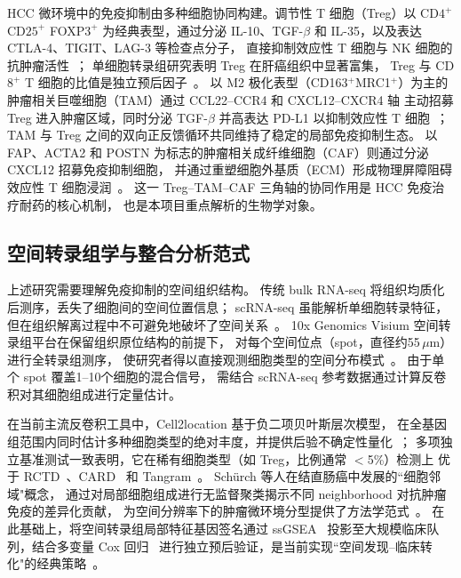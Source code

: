 \documentclass[12pt, a4paper]{ctexart}
\begin{document}
HCC 微环境中的免疫抑制由多种细胞协同构建。调节性 T 细胞（Treg）以 CD$4^+$CD$25^+$ FOXP$3^+$ 为经典表型，通过分泌 IL-10、TGF-$\beta$ 和 IL-35，以及表达 CTLA-4、TIGIT、LAG-3 等检查点分子，
直接抑制效应性 T 细胞与 NK 细胞的抗肿瘤活性~\citep{sakaguchi2020regulatory}；
单细胞转录组研究表明 Treg 在肝癌组织中显著富集，
Treg 与 CD$8^+$ T 细胞的比值是独立预后因子~\citep{zheng2017landscape}。
以 M2 极化表型（CD163$^+$MRC1$^+$）为主的肿瘤相关巨噬细胞（TAM）通过 CCL22--CCR4 和 CXCL12--CXCR4 轴
主动招募 Treg 进入肿瘤区域，同时分泌 TGF-$\beta$ 并高表达 PD-L1 以抑制效应性 T 细胞~\citep{noy2014tumor}；
TAM 与 Treg 之间的双向正反馈循环共同维持了稳定的局部免疫抑制生态。
以 FAP、ACTA2 和 POSTN 为标志的肿瘤相关成纤维细胞（CAF）则通过分泌 CXCL12 招募免疫抑制细胞，
并通过重塑细胞外基质（ECM）形成物理屏障阻碍效应性 T 细胞浸润~\citep{kalluri2016biology,mariathasan2018tgfb}。
这一 Treg--TAM--CAF 三角轴的协同作用是 HCC 免疫治疗耐药的核心机制，
也是本项目重点解析的生物学对象。

\subsection{空间转录组学与整合分析范式}

上述研究需要理解免疫抑制的空间组织结构。
传统 bulk RNA-seq 将组织均质化后测序，丢失了细胞间的空间位置信息；
scRNA-seq 虽能解析单细胞转录特征，但在组织解离过程中不可避免地破坏了空间关系~\citep{luecken2019current}。
10x Genomics Visium 空间转录组平台在保留组织原位结构的前提下，
对每个空间位点（spot，直径约55\,$\mu$m）进行全转录组测序，
使研究者得以直接观测细胞类型的空间分布模式~\citep{williams2022introduction}。
由于单个 spot 覆盖1--10个细胞的混合信号，
需结合 scRNA-seq 参考数据通过计算反卷积对其细胞组成进行定量估计。

在当前主流反卷积工具中，Cell2location 基于负二项贝叶斯层次模型，
在全基因组范围内同时估计多种细胞类型的绝对丰度，并提供后验不确定性量化~\citep{kleshchevnikov2022cell2location}；
多项独立基准测试一致表明，它在稀有细胞类型（如 Treg，比例通常 $<$5\%）检测上
优于 RCTD~\citep{cable2021robust}、CARD~\citep{ma2022integrative} 和 Tangram~\citep{biancalani2021deep,li2022benchmarking,sang2024spotless,yan2023benchmarking}。
Schürch 等人在结直肠癌中发展的``细胞邻域"概念，
通过对局部细胞组成进行无监督聚类揭示不同 neighborhood 对抗肿瘤免疫的差异化贡献，
为空间分辨率下的肿瘤微环境分型提供了方法学范式~\citep{schurch2020coordinated}。
在此基础上，将空间转录组局部特征基因签名通过 ssGSEA~\citep{barbie2009systematic}
投影至大规模临床队列，结合多变量 Cox 回归~\citep{cox1972regression}
进行独立预后验证，是当前实现``空间发现--临床转化"的经典策略~\citep{hanzelmann2013gsva}。
\end{document}
